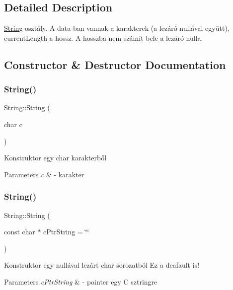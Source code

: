 \subsection{Detailed Description}
\mbox{\hyperlink{class_string}{String}} osztály. A data-\/ban vannak a karakterek (a lezáró nullával együtt), current\+Length a hossz. A hosszba nem számít bele a lezáró nulla. 

\subsection{Constructor \& Destructor Documentation}
\mbox{\label{class_string_a1fdfe981d2c5e0075c1669dd94553082}} 
\subsubsection{\texorpdfstring{String()}{String()}\hspace{0.1cm}{\footnotesize\ttfamily [1/3]}}
{\footnotesize\ttfamily String\+::\+String (\begin{DoxyParamCaption}\item[{char}]{c }\end{DoxyParamCaption})}

Konstruktor egy char karakterből 
\begin{DoxyParams}{Parameters}
{\em c} & -\/ karakter \\
\hline
\end{DoxyParams}
\mbox{\label{class_string_a53f2ea0aea3b2544a85713e47d12bc6f}} 
\subsubsection{\texorpdfstring{String()}{String()}\hspace{0.1cm}{\footnotesize\ttfamily [2/3]}}
{\footnotesize\ttfamily String\+::\+String (\begin{DoxyParamCaption}\item[{const char $\ast$}]{c\+Ptr\+String = {\ttfamily \char`\"{}\char`\"{}} }\end{DoxyParamCaption})}

Konstruktor egy nullával lezárt char sorozatból Ez a deafault is! 
\begin{DoxyParams}{Parameters}
{\em c\+Ptr\+String} & -\/ pointer egy C sztringre \\
\hline
\end{DoxyParams}
\mbox{\label{class_string_a3fee67296a8d2901d5fbc04ee56d15e4}} 
